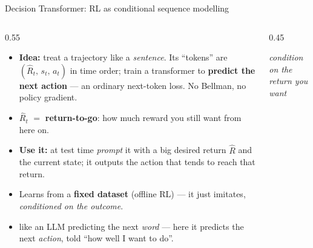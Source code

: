 \begin{frame}{Decision Transformer: RL as conditional sequence modelling}
\begin{columns}[c]
\begin{column}{0.55\textwidth}
\begin{itemize}\footnotesize\itemsep0.45em
    \item \textbf{Idea:} treat a trajectory like a \emph{sentence}. Its ``tokens'' are
          $(\hat R_t,\, s_t,\, a_t)$ in time order; train a transformer to
          \textbf{predict the next action} --- an ordinary next-token loss. No Bellman, no
          policy gradient.
    \item $\hat R_t$ $=$ \textbf{return-to-go}: how much reward you still want from here on.
    \item \textbf{Use it:} at test time \emph{prompt} it with a big desired return $\hat R$
          and the current state; it outputs the action that tends to reach that return.
    \item Learns from a \textbf{fixed dataset} (offline RL) --- it just imitates,
          \emph{conditioned on the outcome}.
    \item {} like an LLM predicting the next \emph{word} --- here it predicts
          the next \emph{action}, told ``how well I want to do''.
\end{itemize}
\end{column}
\begin{column}{0.45\textwidth}
\centering
{}
\vspace{0.8em}

{\footnotesize\itshape condition on the return you want}
\end{column}
\end{columns}
\end{frame}


